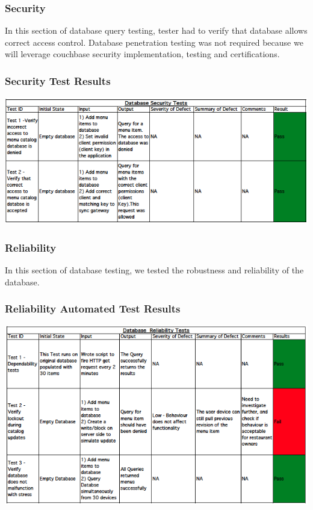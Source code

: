 \documentclass[12pt, titlepage]{article}
\begin{document}
\subsubsection{Security}
In this section of database query testing, tester had to verify that database allows correct access control. Database penetration testing was not required because we will leverage couchbase security implementation, testing and certifications.
\subsubsection{Security Test Results}
\includegraphics[width=\textwidth,height=\textheight,keepaspectratio]{security_tests.png}

\subsubsection{Reliability}
In this section of database testing, we tested the robustness and reliability of the database. 
\subsubsection{Reliability Automated Test Results }
\includegraphics[width=\textwidth,height=\textheight,keepaspectratio]{reliability_tests.png}
\end{document}
